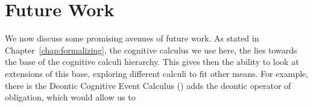 \section{Future Work}

We now discuss some promising avenues of future work. As stated in Chapter~\ref{chap:formalizing},
the cognitive calculus we use here, the \CEC lies towards the base of the cognitive calculi hierarchy.
This gives then the ability to look at extensions of this base, exploring different calculi to
fit other means. For example, there is the Deontic Cognitive Event Calculus (\DCEC) adds the deontic
operator of obligation, which would allow us to
